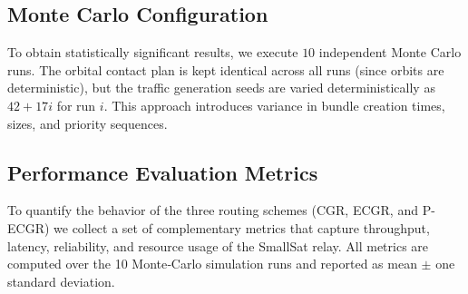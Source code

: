 \documentclass[a4paper,fleqn]{cas-dc}
\newcommand{\ecgr}{\textsf{ECGR}}
\newcommand{\cgr}{\textsf{CGR}}
\newcommand{\pecgr}{\textsf{P-ECGR}}
\begin{document}
\subsection{Monte Carlo Configuration}
To obtain statistically significant results, we execute $10$ independent Monte Carlo runs. The orbital contact plan is kept identical across all runs (since orbits are deterministic), but the traffic generation seeds are varied deterministically as $42 + 17i$ for run $i$. This approach introduces variance in bundle creation times, sizes, and priority sequences.

\subsection{Performance Evaluation Metrics}
\label{sec:metrics}
To quantify the behavior of the three routing schemes (\cgr{}, \ecgr{}, and \pecgr{}) we collect a set of complementary metrics that capture throughput, latency, reliability, and resource usage of the SmallSat relay. All metrics are computed over the 10 Monte‑Carlo simulation runs and reported as mean $\pm$ one standard deviation.
\end{document}
